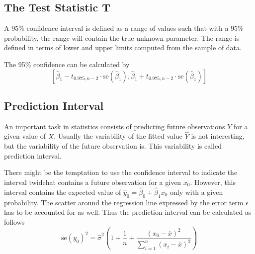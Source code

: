 \documentclass[11pt]{article}
\theoremstyle{definition}
\newcommand*\samplemean[1]{\overline{#1}}
\begin{document}
\subsection{The Test Statistic T}
\begin{definition}
	A 95\% confidence interval is defined as a range of values such that with a 95\% probability, the range will contain the true unknown parameter. The range is defined in terms of lower and upper limits computed from the sample of data.
\end{definition}
The 95\% confidence can be calculated by
\begin{equation*}
	\left[ \hat{\beta}_1 - t_{0.975, n-2} \cdot \text{se}(\hat{\beta}_1), \hat{\beta}_1 + t_{0.975, n-2} \cdot \text{se}(\hat{\beta}_1) \right]
\end{equation*}

\subsection{Prediction Interval}
An important task in statistics consists of predicting future observations $Y$ for a given value of $X$. Usually the variability of the fitted value $\widehat{Y}$ is not interesting, but the variability of the future observation is. This variability is called prediction interval.

There might be the temptation to use the confidence interval to indicate the interval twidehat contains a future observation for a given $x_0$. However, this interval contains the expected value of $\widehat{y}_0 = \widehat{\beta}_0 + \widehat{\beta}_1 x_0$ only with a given probability. The scatter around the regression line expressed by the error term $\epsilon$ has to be accounted for as well. Thus the prediction interval can be calculated as follows
\begin{equation*}
\text{se}(y_0)^2 = \widehat{\sigma}^2(1 + \frac{1}{n} + \frac{(x_0 - \samplemean{x})^2}{\sum_{i=1}^{n}(x_i - \samplemean{x})^2})
\end{equation*}
\end{document}
